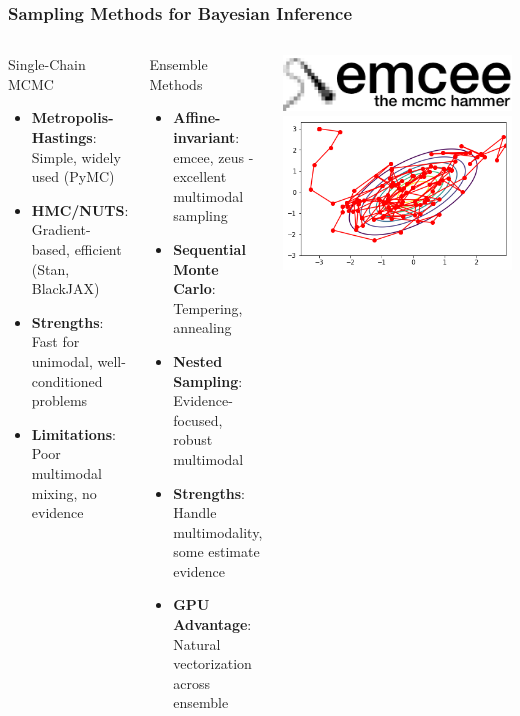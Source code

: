 \documentclass[aspectratio=169]{beamer}
\begin{document}
\begin{frame}
    \frametitle{Sampling Methods for Bayesian Inference}
    \begin{columns}
        \begin{block}{Single-Chain MCMC}
            \begin{itemize}
                \item \textbf{Metropolis-Hastings}: Simple, widely used (PyMC)
                \item \textbf{HMC/NUTS}: Gradient-based, efficient (Stan, BlackJAX)
                \item \textbf{Strengths}: Fast for unimodal, well-conditioned problems
                \item \textbf{Limitations}: Poor multimodal mixing, no evidence
            \end{itemize}
        \end{block}
        \begin{block}{Ensemble Methods}
            \begin{itemize}
                \item \textbf{Affine-invariant}: emcee, zeus - excellent multimodal sampling
                \item \textbf{Sequential Monte Carlo}: Tempering, annealing
                \item \textbf{Nested Sampling}: Evidence-focused, robust multimodal
                \item \textbf{Strengths}: Handle multimodality, some estimate evidence
                \item \textbf{GPU Advantage}: Natural vectorization across ensemble
            \end{itemize}
        \end{block}
        \begin{columns}
        \includegraphics[width=\textwidth]{figures/emcee}
        \includegraphics[width=\textwidth]{figures/metropolis-hastings}

\end{columns}
\end{columns}
\end{frame}
\end{document}
